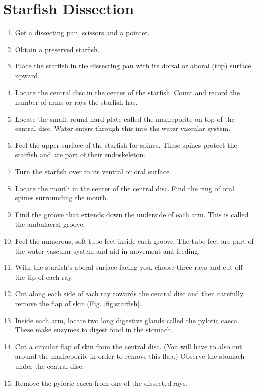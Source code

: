 \section{Starfish Dissection}\label{perform-starfish-dissection}

\begin{enumerate}
\def\labelenumi{\arabic{enumi}.}
\tightlist
\item
  Get a dissecting pan, scissors and a pointer.
\item
  Obtain a preserved starfish.
\item
  Place the starfish in the dissecting pan with its dorsal or aboral
  (top) surface upward.
\item
  Locate the central disc in the center of the starfish. Count and
  record the number of arms or rays the starfish has.
\item
  Locate the small, round hard plate called the madreporite on top of
  the central disc. Water enters through this into the water vascular
  system.
\item
  Feel the upper surface of the starfish for spines. These spines
  protect the starfish and are part of their endoskeleton.
\item
  Turn the starfish over to its ventral or oral surface.
\item
  Locate the mouth in the center of the central disc. Find the ring of
  oral spines surrounding the mouth.
\item
  Find the groove that extends down the underside of each arm. This is
  called the ambulacral groove.
\item
  Feel the numerous, soft tube feet inside each groove. The tube feet
  are part of the water vascular system and aid in movement and feeding.
\item
  With the starfish's aboral surface facing you, choose three rays and
  cut off the tip of each ray.
\item
  Cut along each side of each ray towards the central disc and then
  carefully remove the flap of skin (Fig. \ref{fig:starfish}.
\item
  Inside each arm, locate two long digestive glands called the pyloric
  caeca. These make enzymes to digest food in the stomach.
\item
  Cut a circular flap of skin from the central disc. (You will have to
  also cut around the madreporite in order to remove this flap.) Observe
  the stomach under the central disc.
\item
  Remove the pyloric caeca from one of the dissected rays.

\end{enumerate}
